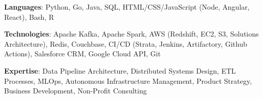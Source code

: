 

\begin{cvparagraph}
\textbf{Languages}: Python, Go, Java, SQL, HTML/CSS/JavaScript (Node, Angular, React), Bash, R

\textbf{Technologies}: Apache Kafka, Apache Spark, AWS (Redshift, EC2, S3, Solutions Architecture), Redis, Couchbase, CI/CD (Strata, Jenkins, Artifactory, Github Actions), Salesforce CRM, Google Cloud API, Git

\textbf{Expertise}: Data Pipeline Architecture, Distributed Systems Design, ETL Processes, MLOps, Autonomous Infrastructure Management, Product Strategy, Business Development, Non-Profit Consulting
\end{cvparagraph}
